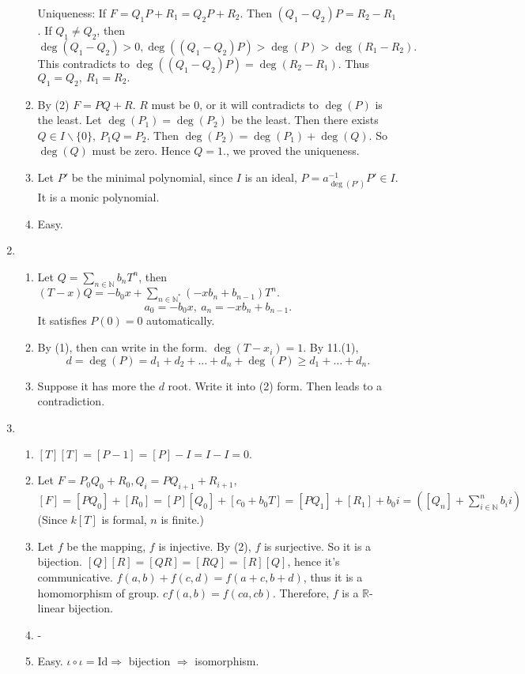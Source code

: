\documentclass[12pt]{article}
\newcommand{\NN}{\mathbb{N}}
\newcommand{\RR}{\mathbb{R}}
\begin{document}
\begin{enumerate}
\begin{enumerate}
                    \newline
                    Uniqueness: If $F=Q_1 P+R_1=Q_2P+R_2$. Then $(Q_1-Q_2)P=R_2-R_1$. If $Q_1\not=Q_2$, then $\deg(Q_1-Q_2)>0, \deg((Q_1-Q_2)P)>\deg(P)>\deg(R_1-R_2).$ This contradicts to $\deg((Q_1-Q_2)P)=\deg(R_2-R_1).$ Thus $Q_1=Q_2,\ R_1=R_2.$
            \item By (2) $F=PQ+R$. $R$ must be $0$, or it will contradicts to $\deg(P)$ is the least. Let $\deg(P_1)=\deg(P_2)$ be the least. Then there exists $Q\in I\backslash\{0\},\ P_1Q=P_2.$ Then $\deg(P_2)=\deg(P_1)+\deg(Q).$ So $\deg(Q)$ must be zero. Hence $Q=1.$, we proved the uniqueness. 
            \item Let $P'$ be the minimal polynomial, since $I$ is an ideal, $P=a_{\deg(P')}^{-1}P'\in I$. It is a monic polynomial.
            \item Easy.
        \end{enumerate} 
    \item
        \begin{enumerate}
            \item Let $Q=\sum_{n\in \NN}b_n T^n$, then $(T-x)Q=-b_0x+\sum_{n\in\NN^*}\left(-xb_n+b_{n-1}\right)T^n.$ 
                $$a_0=-b_0 x,\ a_n=-xb_n+b_{n-1}.$$
                It satisfies $P(0)=0$ automatically.
            \item By (1), then can write in the form. $\deg(T-x_i)=1$. By 11.(1), 
                $$d=\deg(P)=d_1+d_2+\dots +d_n+\deg(P)\ge d_1+\dots+d_n.$$
            \item Suppose it has more the $d$ root. Write it into (2) form. Then leads to a contradiction.
        \end{enumerate}
    \item
        \begin{enumerate}
            \item $[T][T]=[P-1]=[P]-I=I-I=0.$
            \item Let $F=P_0Q_0+R_0, Q_i=PQ_{i+1}+R_{i+1}$, $ [F]=[PQ_0]+[R_0]=[P][Q_0]+[c_0+b_0T]=[PQ_1]+[R_1]+b_0i=\left([Q_n]+\sum_{i\in \NN}^{n}b_ii\right)$ (Since $k[T]$ is formal, $n$ is finite.)
            \item Let $f$ be the mapping, $f$ is injective. By (2), $f$ is surjective. So it is a bijection. $[Q][R]=[QR]=[RQ]=[R][Q]$, hence it's communicative. $f(a,b)+f(c,d)=f(a+c,b+d)$, thus it is a homomorphism of group. $cf(a,b)=f(ca,cb)$. Therefore, $f$ is a $\RR$-linear bijection.
            \item -
            \item Easy. $\iota\circ\iota=\mathrm{Id}\Rightarrow $ bijection $\Rightarrow$ isomorphism.

\end{enumerate}
\end{enumerate}
\end{document}
